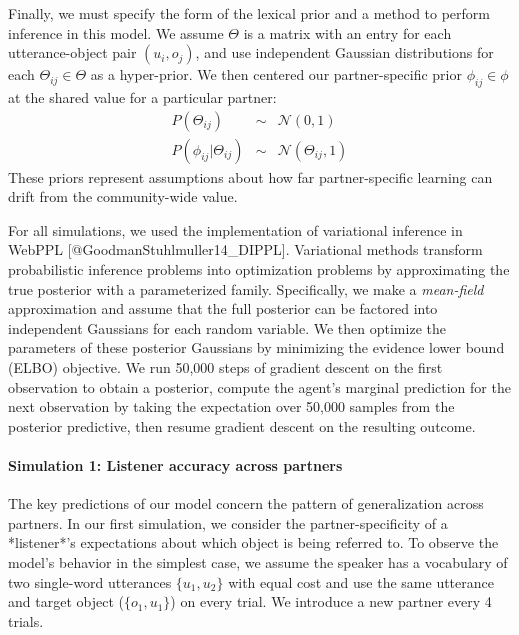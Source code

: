 \documentclass[11pt, floatsintext]{apa6}
\begin{document}
Finally, we must specify the form of the lexical prior and a method to perform inference in this model.
We assume $\Theta$ is a matrix with an entry for each utterance-object pair $(u_i, o_j)$, and use independent Gaussian distributions for each $\Theta_{ij} \in \Theta$ as a hyper-prior.
We then centered our partner-specific prior $\phi_{ij} \in \phi$ at the shared value for a particular partner:
$$\begin{array}{rcl}
P(\Theta_{ij}) & \sim & \mathcal{N}(0, 1)\\
P(\phi_{ij} | \Theta_{ij}) & \sim & \mathcal{N}(\Theta_{ij}, 1)
\end{array}$$
These priors represent assumptions about how far partner-specific learning can drift from the community-wide value.

For all simulations, we used the implementation of variational inference in WebPPL [@GoodmanStuhlmuller14_DIPPL]. 
Variational methods transform probabilistic inference problems into optimization problems by approximating the true posterior with a parameterized family.
Specifically, we make a \emph{mean-field} approximation and assume that the full posterior can be factored into independent Gaussians for each random variable. 
We then optimize the parameters of these posterior Gaussians by minimizing the evidence lower bound (ELBO) objective.
We run 50,000 steps of gradient descent on the first observation to obtain a posterior, compute the agent's marginal prediction for the next observation by taking the expectation over 50,000 samples from the posterior predictive, then resume gradient descent on the resulting outcome.

\paragraph{Simulation 1: Listener accuracy across partners}

The key predictions of our model concern the pattern of generalization across partners.
In our first simulation, we consider the partner-specificity of a *listener*'s expectations about which object is being referred to.
To observe the model's behavior in the simplest case, we assume the speaker has a vocabulary of two single-word utterances $\{u_1, u_2\}$ with equal cost and use the same utterance and target object ($\{o_1, u_1\}$) on every trial.
We introduce a new partner every 4 trials.
\end{document}
